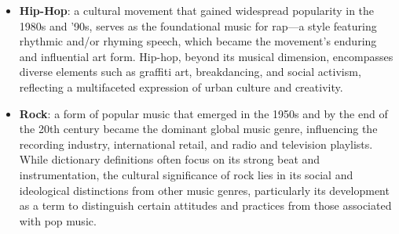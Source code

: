\begin{itemize}
    \item \textbf{Hip-Hop}: a cultural movement that gained widespread popularity in the 1980s and '90s, serves as the foundational music for rap—a style featuring rhythmic and/or rhyming speech, which became the movement's enduring and influential art form. 
    Hip-hop, beyond its musical dimension, encompasses diverse elements such as graffiti art, breakdancing, and social activism, reflecting a multifaceted expression of urban culture and creativity. \cite{tate_2019_hiphop} \nocite{seanmccollum_2019_hiphop}
    \item \textbf{Rock}: a form of popular music that emerged in the 1950s and by the end of the 20th century became the dominant global music genre, influencing the recording industry, international retail, and radio and television playlists. 
    While dictionary definitions often focus on its strong beat and instrumentation, the cultural significance of rock lies in its social and ideological distinctions from other music genres, particularly its development as a term to distinguish certain attitudes and practices from those associated with pop music.\cite{frith_2018_rock}
\end{itemize}

